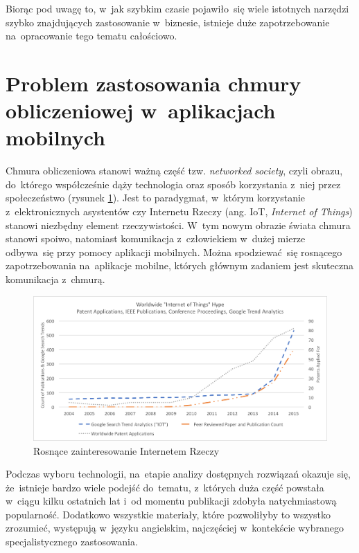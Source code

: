 \documentclass[12pt,a4paper,twoside,titlepage,openright]{book}
\begin{document}
Biorąc pod uwagę to, w~jak szybkim czasie pojawiło~się wiele istotnych narzędzi szybko znajdujących zastosowanie w~biznesie, istnieje duże zapotrzebowanie na~opracowanie tego tematu całościowo. 

\section*{Problem zastosowania chmury obliczeniowej w~aplikacjach mobilnych}

Chmura obliczeniowa stanowi ważną część tzw. \textit{networked society}, czyli obrazu, do~którego współcześnie dąży technologia oraz sposób korzystania z~niej przez społeczeństwo (rysunek \ref{fig:iot-hype}). Jest to paradygmat, w~którym korzystanie z~elektronicznych asystentów czy Internetu Rzeczy (ang. IoT, \textit{Internet of Things}) stanowi niezbędny element rzeczywistości.\cite{ccSpringer} W~tym nowym obrazie świata chmura stanowi spoiwo, natomiast komunikacja z~człowiekiem w~dużej mierze odbywa~się przy pomocy aplikacji mobilnych. Można spodziewać~się rosnącego zapotrzebowania na~aplikacje mobilne, których głównym zadaniem jest skuteczna komunikacja z~chmurą. 

\begin{figure}[h]
	\centering
			\includegraphics[width=\textwidth]{iot-hype.png}
		\caption{Rosnące zainteresowanie Internetem Rzeczy \cite{iotArchitects}}
		\label{fig:iot-hype}
\end{figure}

Podczas wyboru technologii, na~etapie analizy dostępnych rozwiązań okazuje się, że~istnieje bardzo wiele podejść do~tematu, z~których duża część powstała w~ciągu kilku ostatnich lat i~od momentu publikacji zdobyła natychmiastową popularność. Dodatkowo wszystkie materiały, które pozwoliłyby to wszystko zrozumieć, występują w~języku angielskim, najczęściej w~kontekście wybranego specjalistycznego zastosowania. 
\end{document}
